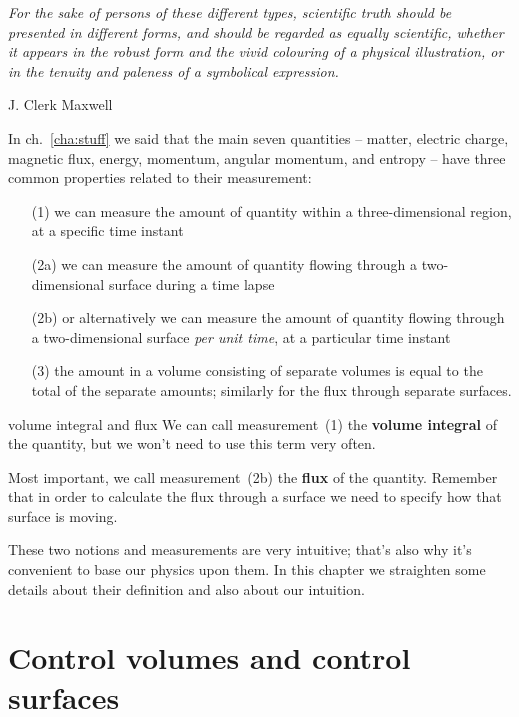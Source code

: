 \documentclass[a4paper,12pt,%
onecolumn,oneside,titlepage,%
british%
]{memoir}
\renewcommand*{\|}[1][]{\nonscript\:#1\vert\nonscript\:\mathopen{}}
\newcommand*{\chap}{ch.}%
\begin{document}
\epigraph{\emph{%
For the sake of persons of these different types, scientific truth should be presented in different forms, and should be regarded as equally scientific, whether it appears in the robust form and the vivid colouring of a physical illustration, or in the tenuity and paleness of a symbolical expression.%
}}{J. Clerk Maxwell \cites*{maxwell1870}}


In \chap~\ref{cha:stuff} we said that the main seven quantities -- matter, electric charge, magnetic flux, energy, momentum, angular momentum, and entropy -- have three common properties related to their measurement:
\begin{enumerate}
\item[(1)] we can measure the amount of quantity within a three-dimensional region, at a specific time instant
\item[(2a)] we can measure the amount of quantity flowing through a two-dimensional surface during a time lapse\textellipsis
\item[(2b)] \textellipsis or alternatively we can measure the amount of quantity flowing through a two-dimensional surface \emph{per unit time}, at a particular time instant
\item[(3)] the amount in a volume consisting of separate volumes is equal to the total of the separate amounts; similarly for the flux through separate surfaces.
\end{enumerate}
\begin{definition}{volume integral and flux}
  We can call measurement~(1) the \textbf{volume integral} of the quantity, but we won't need to use this term very often.

  \smallskip

  Most important, we call measurement~(2b) the \textbf{flux} of the quantity. Remember that in order to calculate the flux through a surface we need to specify how that surface is moving.
\end{definition}



\smallskip


These two notions and measurements are very intuitive; that's also why it's convenient to base our physics upon them. In this chapter we straighten some details about their definition and also about our intuition.

\section{Control volumes and control surfaces}
\label{sec:choice_surfaces}
\end{document}
